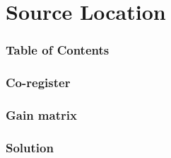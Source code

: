 \documentclass{beamer}
\begin{document}
\section{Source Location}

\begin{frame}
    \frametitle{Table of Contents}
    \tableofcontents[currentsection]
\end{frame}

\begin{frame}
    \frametitle{Co-register}
\end{frame}

\begin{frame}
    \frametitle{Gain matrix}
\end{frame}

\begin{frame}
    \frametitle{Solution}
\end{frame}
\end{document}
